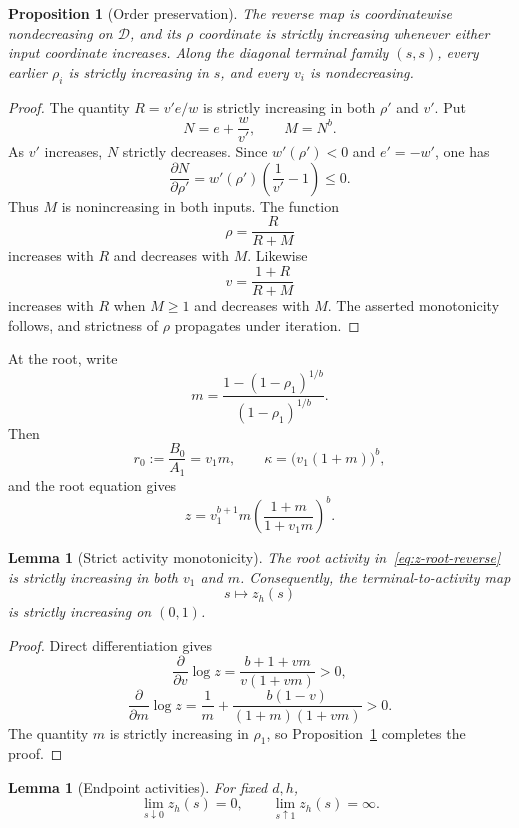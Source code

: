 \documentclass[11pt]{amsart}
\newtheorem{proposition}[theorem]{Proposition}
\newtheorem{lemma}[theorem]{Lemma}
\theoremstyle{definition}
\newcommand{\Dcal}{\mathcal D}
\begin{document}
\begin{proposition}[Order preservation]\label{prop:order-preserving}
The reverse map is coordinatewise nondecreasing on $\Dcal$, and its $\rho$ coordinate is strictly increasing whenever either input coordinate increases.  Along the diagonal terminal family $(s,s)$, every earlier $\rho_i$ is strictly increasing in $s$, and every $v_i$ is nondecreasing.
\end{proposition}

\begin{proof}
The quantity $R=v'e/w$ is strictly increasing in both $\rho'$ and $v'$.  Put
\[
 N=e+\frac w{v'},
 \qquad M=N^b.
\]
As $v'$ increases, $N$ strictly decreases.  Since $w'(\rho')<0$ and $e'=-w'$, one has
\[
 \frac{\partial N}{\partial\rho'}
 =w'(\rho')\left(\frac1{v'}-1\right)\le0.
\]
Thus $M$ is nonincreasing in both inputs.  The function
\[
 \rho=\frac R{R+M}
\]
increases with $R$ and decreases with $M$.  Likewise
\[
 v=\frac{1+R}{R+M}
\]
increases with $R$ when $M\ge1$ and decreases with $M$.  The asserted monotonicity follows, and strictness of $\rho$ propagates under iteration.
\end{proof}

At the root, write
\[
 m=\frac{1-(1-\rho_1)^{1/b}}{(1-\rho_1)^{1/b}}.
\]
Then
\[
 r_0:=\frac{B_0}{A_1}=v_1m,
 \qquad
 \kappa=\bigl(v_1(1+m)\bigr)^b,
\]
and the root equation gives
\begin{equation}\label{eq:z-root-reverse}
 \boxed{
 z=v_1^{b+1}m
 \left(\frac{1+m}{1+v_1m}\right)^b.
 }
\end{equation}

\begin{lemma}[Strict activity monotonicity]\label{lem:z-monotone}
The root activity in~\eqref{eq:z-root-reverse} is strictly increasing in both $v_1$ and $m$.  Consequently, the terminal-to-activity map
\[
 s\longmapsto z_h(s)
\]
is strictly increasing on $(0,1)$.
\end{lemma}

\begin{proof}
Direct differentiation gives
\[
 \frac{\partial}{\partial v}\log z
 =\frac{b+1+vm}{v(1+vm)}>0,
\]
\[
 \frac{\partial}{\partial m}\log z
 =\frac1m+
 \frac{b(1-v)}{(1+m)(1+vm)}>0.
\]
The quantity $m$ is strictly increasing in $\rho_1$, so Proposition~\ref{prop:order-preserving} completes the proof.
\end{proof}

\begin{lemma}[Endpoint activities]\label{lem:z-endpoints}
For fixed $d,h$,
\[
 \lim_{s\downarrow0}z_h(s)=0,
 \qquad
 \lim_{s\uparrow1}z_h(s)=\infty.
\]
\end{lemma}
\end{document}
